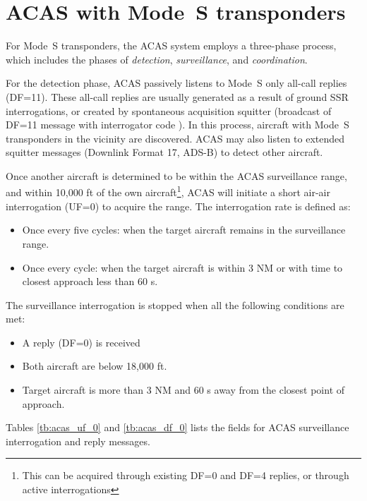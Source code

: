 \section{ACAS with Mode~S transponders}

For Mode~S transponders, the ACAS system employs a three-phase process, which includes the phases of \emph{detection}, \emph{surveillance}, and \emph{coordination}.

For the detection phase, ACAS passively listens to Mode~S only all-call replies (DF=11). These all-call replies are usually generated as a result of ground SSR interrogations, or created by spontaneous acquisition squitter (broadcast of DF=11 message with interrogator code \0). In this process, aircraft with Mode~S transponders in the vicinity are discovered. ACAS may also listen to extended squitter messages (Downlink Format 17, ADS-B) to detect other aircraft.

Once another aircraft is determined to be within the ACAS surveillance range, and within 10,000 ft of the own aircraft\footnote{This can be acquired through existing DF=0 and DF=4 replies, or through active interrogations}, ACAS will initiate a short air-air interrogation (UF=0) to acquire the range. The interrogation rate is defined as:

\begin{itemize}
  \item Once every five cycles: when the target aircraft remains in the surveillance range.
  \item Once every cycle: when the target aircraft is within 3 NM or with time to closest approach less than 60 s.
\end{itemize}


The surveillance interrogation is stopped when all the following conditions are met:

\begin{itemize}
  \item A reply (DF=0) is received
  \item Both aircraft are below 18,000 ft.
  \item Target aircraft is more than 3 NM and 60 s away from the closest point of approach.
\end{itemize}


Tables \ref{tb:acas_uf_0} and \ref{tb:acas_df_0} lists the fields for ACAS surveillance interrogation and reply messages.

